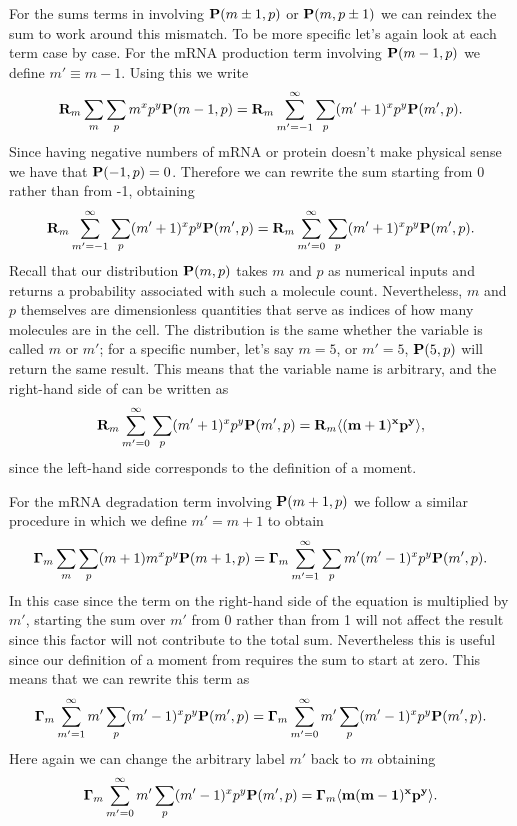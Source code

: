 For the sums terms in  involving $\mathbf{P}(m \pm 1, p)$ or
$\mathbf{P}(m, p \pm 1)$ we can reindex the sum to work around this mismatch. To be
more specific let's again look at each term case by case. For the mRNA
production term involving $\mathbf{P}(m-1, p)$ we define $m' \equiv m - 1$. Using this
we write
\begin{equation}
  \mathbf{R}_m \sum_m \sum_p m^x p^y \mathbf{P}(m-1, p) =
  \mathbf{R}_m \sum_{m' = -1}^\infty \sum_p (m' + 1)^x p^y \mathbf{P}(m', p).
\end{equation}
Since having negative numbers of mRNA or protein doesn't make physical sense
we have that $\mathbf{P}(-1, p) = 0$. Therefore we can rewrite the sum starting from 0
rather than from -1, obtaining
\begin{equation}
  \mathbf{R}_m \sum_{m' = -1}^\infty \sum_p (m' + 1)^x p^y \mathbf{P}(m', p) =
  \mathbf{R}_m \sum_{m'=0}^\infty \sum_p (m' + 1)^x p^y \mathbf{P}(m', p).
  \label{seq_reindex}
\end{equation}
Recall that our distribution $\mathbf{P}(m, p)$ takes $m$ and $p$ as numerical inputs 
and returns a probability associated with such a molecule count.  Nevertheless,
$m$ and $p$ themselves are dimensionless quantities that serve as indices of how
many molecules are in the cell. The distribution is the same whether the
variable is called $m$ or $m'$; for a specific number, let's say $m = 5$, or $m'
= 5$, $\mathbf{P}(5, p)$ will return the same result. This means that the variable name
is arbitrary, and the right-hand side of
 can be written as
\begin{equation}
  \mathbf{R}_m \sum_{m'=0}^\infty \sum_p (m' + 1)^x p^y \mathbf{P}(m', p) =
  \mathbf{R}_m \mathbf{\left\langle (m+1)^x p^y \right\rangle},
\end{equation}
since the left-hand side corresponds to the definition of a moment.

For the mRNA degradation term involving $\mathbf{P}(m + 1, p)$ we follow a similar
procedure in which we define $m' = m + 1$ to obtain
\begin{equation}
  \mathbf{\Gamma}_m \sum_m \sum_p (m + 1) m^x p^y \mathbf{P}(m + 1, p) =
  \mathbf{\Gamma}_m \sum_{m' = 1}^\infty \sum_p m' (m' - 1)^x p^y \mathbf{P}(m', p).
\end{equation}
In this case since the term on the right-hand side of the equation is multiplied
by $m'$, starting the sum over $m'$ from 0 rather than from 1 will not affect
the result since this factor will not contribute to the total sum. Nevertheless
this is useful since our definition of a moment from  requires
the sum to start at zero. This means that we can rewrite this term as
\begin{equation}
  \mathbf{\Gamma}_m \sum_{m' = 1}^\infty m' \sum_p (m' - 1)^x p^y \mathbf{P}(m', p) =
  \mathbf{\Gamma}_m \sum_{m' = 0}^\infty m' \sum_p (m' - 1)^x p^y \mathbf{P}(m', p).
\end{equation}
Here again we can change the arbitrary label $m'$ back to $m$ obtaining
\begin{equation}
  \mathbf{\Gamma}_m \sum_{m' = 0}^\infty m' \sum_p (m' - 1)^x p^y \mathbf{P}(m', p) =
  \mathbf{\Gamma}_m \mathbf{\left\langle m (m - 1)^x p^y \right\rangle}.
\end{equation}

